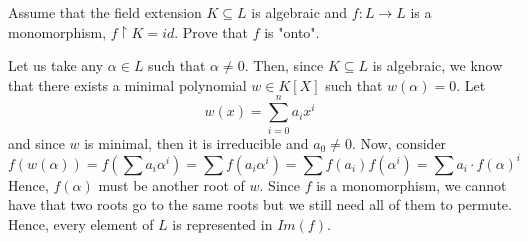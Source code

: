 \documentclass{article}
\begin{document}

\begin{problem}[4]{}
Assume that the field extension $K\subseteq L$ is algebraic and $f:L\to L$ is a monomorphism, $f\restriction K=id$. Prove that $f$ is "onto".
\end{problem}

Let us take any $\alpha\in L$ such that $\alpha\neq 0$. Then, since $K\subseteq L$ is algebraic, we know that there exists a minimal polynomial $w\in K[X]$ such that $w(\alpha)=0$. Let
$$w(x)=\sum\limits_{i=0}^na_ix^i$$
and since $w$ is minimal, then it is irreducible and $a_0\neq 0$. Now, consider
$$f(w(\alpha))=f(\sum a_i\alpha^i)=\sum f(a_i\alpha^i)=\sum f(a_i)f(\alpha^i)=\sum a_i\cdot f(\alpha)^i$$
Hence, $f(\alpha)$ must be another root of $w$. Since $f$ is a monomorphism, we cannot have that two roots go to the same roots but we still need all of them to permute. Hence, every element of $L$ is represented in $Im(f)$.
\end{document}
